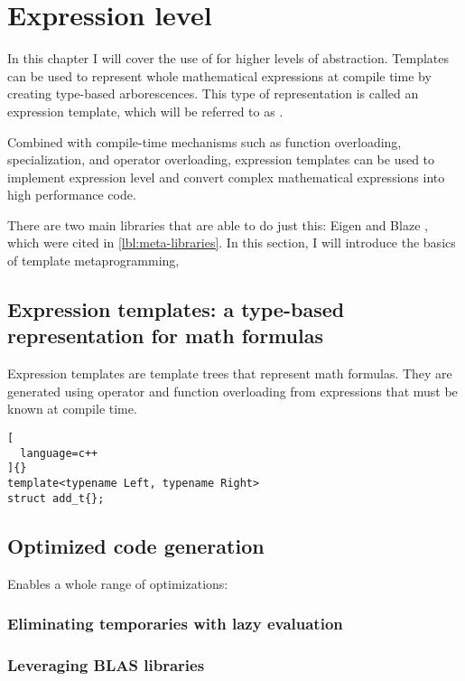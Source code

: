 \documentclass[../main]{subfiles}
\begin{document}
\section{
  Expression level
}
\label{lbl:expression-level-metaprogramming}

In this chapter I will cover the use of \tmp for higher levels
of abstraction. Templates can be used to represent whole mathematical
expressions at compile time by creating type-based arborescences.
This type of representation is called an expression
template\cite{veldhuizen:1995}, which will be referred to as \et.

Combined with compile-time mechanisms such as function overloading,
specialization, and operator overloading, expression templates can be used to
implement expression level \dsels and convert complex mathematical expressions
into high performance code.

There are two main libraries that are able to do just this: Eigen \cite{eigen}
and Blaze \cite{blazelib}, which were cited in \ref{lbl:meta-libraries}.
In this section, I will introduce the basics of \cpp template metaprogramming,

\subsection{
  Expression templates: a type-based representation for math formulas
}

Expression templates are template trees that represent math formulas.
They are generated using operator and function overloading from expressions
that must be known at compile time.

\begin{lstlisting}[
  language=c++
]{}
template<typename Left, typename Right>
struct add_t{};
\end{lstlisting}


\subsection{
  Optimized code generation
}

Enables a whole range of optimizations:

\subsubsection{
  Eliminating temporaries with lazy evaluation
}

\subsubsection{
  Leveraging BLAS libraries
}
\end{document}
